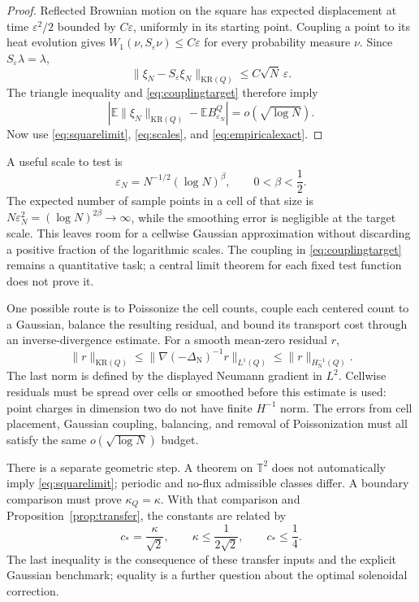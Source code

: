 \documentclass[11pt]{article}
\theoremstyle{definition}
\newcommand{\E}{\mathbb E}
\newcommand{\T}{\mathbb T}
\newcommand{\KR}{\mathrm{KR}}
\begin{document}
\begin{proof}
Reflected Brownian motion on the square has expected displacement at
time $\varepsilon^2/2$ bounded by $C\varepsilon$, uniformly in its
starting point. Coupling a point to its heat evolution gives
$W_1(\nu,S_\varepsilon\nu)\leq C\varepsilon$ for every probability
measure $\nu$. Since $S_\varepsilon\lambda=\lambda$,
\[
  \|\xi_N-S_\varepsilon\xi_N\|_{\KR(Q)}
  \leq C\sqrt N\,\varepsilon.
\]
The triangle inequality and \eqref{eq:couplingtarget} therefore imply
\[
  \left|\E\|\xi_N\|_{\KR(Q)}-\E B_{\varepsilon_N}^Q\right|
  =o(\sqrt{\log N}).
\]
Now use \eqref{eq:squarelimit}, \eqref{eq:scales}, and
\eqref{eq:empiricalexact}.
\end{proof}

A useful scale to test is
\begin{equation}\label{eq:mesoscale}
  \varepsilon_N=N^{-1/2}(\log N)^\beta,
  \qquad 0<\beta<\frac12.
\end{equation}
The expected number of sample points in a cell of that size is
$N\varepsilon_N^2=(\log N)^{2\beta}\to\infty$, while the smoothing error
is negligible at the target scale. This leaves room for a cellwise
Gaussian approximation without discarding a positive fraction of the
logarithmic scales. The coupling in \eqref{eq:couplingtarget} remains a
quantitative task; a central limit theorem for each fixed test function
does not prove it.

One possible route is to Poissonize the cell counts, couple each
centered count to a Gaussian, balance the resulting residual, and bound
its transport cost through an inverse-divergence estimate. For a smooth
mean-zero residual $r$,
\begin{equation}\label{eq:hminusone}
  \|r\|_{\KR(Q)}
  \leq\|\nabla(-\Delta_{\mathrm N})^{-1}r\|_{L^1(Q)}
  \leq\|r\|_{H^{-1}_{\mathrm N}(Q)}.
\end{equation}
The last norm is defined by the displayed Neumann gradient in $L^2$.
Cellwise residuals must be spread over cells or smoothed before this
estimate is used: point charges in dimension two do not have finite
$H^{-1}$ norm. The errors from cell placement, Gaussian coupling,
balancing, and removal of Poissonization must all satisfy the same
$o(\sqrt{\log N})$ budget.

There is a separate geometric step. A theorem on $\T^2$ does not
automatically imply \eqref{eq:squarelimit}; periodic and no-flux
admissible classes differ. A boundary comparison must prove
$\kappa_Q=\kappa$. With that comparison and
Proposition~\ref{prop:transfer}, the constants are related by
\begin{equation}\label{eq:constants}
  c_*=\frac\kappa{\sqrt2},\qquad
  \kappa\leq\frac1{2\sqrt2},\qquad c_*\leq\frac14.
\end{equation}
The last inequality is the consequence of these transfer inputs and the
explicit Gaussian benchmark; equality is a further question about the
optimal solenoidal correction.
\end{document}
